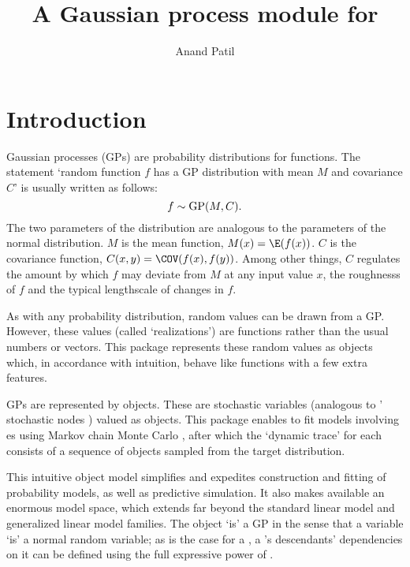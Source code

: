 \documentclass[article]{jss}
\author{Anand Patil}
\title{A Gaussian process module for \pkg{PyMC}}
\begin{document}
\maketitle

\tableofcontents


\section{Introduction}\label{sec:firstlook}

Gaussian processes (GPs) are probability distributions for functions. The statement `random function $f$ has a GP distribution with mean $M$ and covariance $C$' is usually written as follows:
\begin{equation}
    f\sim\textup{GP}(M,C).
\end{equation}
The two parameters of the distribution are analogous to the parameters of the normal distribution. $M$ is the mean function, $M(x)=\E(f(x))$. $C$ is the covariance function, $C(x,y)=\COV(f(x),f(y))$. Among other things, $C$ regulates the amount by which $f$ may deviate from $M$ at any input value $x$, the roughnesss of $f$ and the typical lengthscale of changes in $f$.

As with any probability distribution, random values can be drawn from a GP. However, these values (called `realizations') are functions rather than the usual numbers or vectors. This package represents these random values as  objects which, in accordance with intuition, behave like  functions with a few extra features.

GPs are represented by  objects. These are  stochastic variables \citep{pymc} (analogous to ' stochastic nodes \citep{bugs}) valued as  objects. This package enables  to fit models involving es using Markov chain Monte Carlo \citep{gamerman}, after which the `dynamic trace' for each  consists of a sequence of  objects sampled from the target distribution. 

This intuitive object model simplifies and expedites construction and fitting of probability models, as well as predictive simulation. It also makes available an enormous model space, which extends far beyond the standard linear model and generalized linear model families. The  object `is' a GP in the sense that a   variable `is' a normal random variable; as is the case for a , a 's descendants' dependencies on it can be defined using the full expressive power of .
\end{document}
